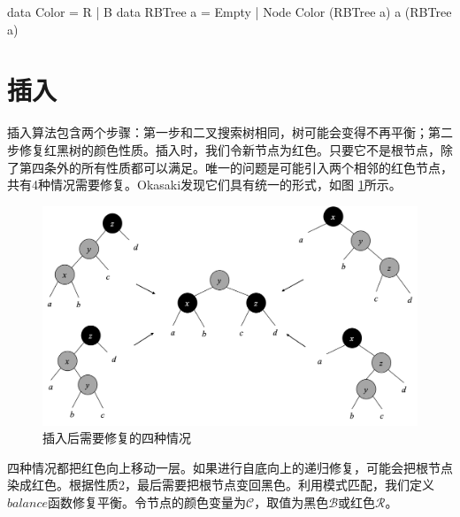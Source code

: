 \documentclass[b5paper]{ctexart}
\begin{document}
\begin{Haskell}
data Color = R | B
data RBTree a = Empty | Node Color (RBTree a) a (RBTree a)
\end{Haskell}

\begin{Exercise}
\end{Exercise}

\section{插入}

插入算法包含两个步骤：第一步和二叉搜索树相同，树可能会变得不再平衡；第二步修复红黑树的颜色性质。插入时，我们令新节点为红色。只要它不是根节点，除了第四条外的所有性质都可以满足。唯一的问题是可能引入两个相邻的红色节点，共有4种情况需要修复。Okasaki发现它们具有统一的形式\cite{okasaki}，如图 \ref{fig:insert-fix}所示。

\begin{figure}[htbp]
  \centering
  \includegraphics[scale=0.4]{img/insert-fix}
  \caption{插入后需要修复的四种情况}
  \label{fig:insert-fix}
\end{figure}

四种情况都把红色向上移动一层。如果进行自底向上的递归修复，可能会把根节点染成红色。根据性质2，最后需要把根节点变回黑色。利用模式匹配，我们定义$balance$函数修复平衡。令节点的颜色变量为$\mathcal{C}$，取值为黑色$\mathcal{B}$或红色$\mathcal{R}$。
\end{document}
